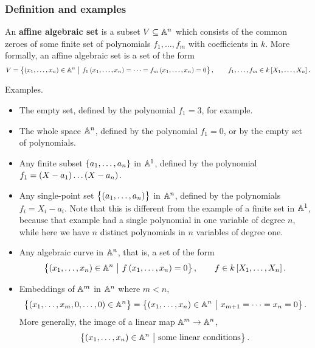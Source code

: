 \subsubsection{Definition and examples}


\begin{definition*}
An \textbf{affine algebraic set} is a subset $ V \subseteq \AA^n $ which consists of the common zeroes of some finite set of polynomials $ f_1, \dots, f_m $ with coefficients in $ k $. More formally, an affine algebraic set is a set of the form
$$ V = \cbr{\br{x_1, \dots, x_n} \in \AA^n \st f_1\br{x_1, \dots, x_n} = \dots = f_m\br{x_1, \dots, x_n} = 0}, \qquad f_1, \dots, f_m \in k\sbr{X_1, \dots, X_n}. $$
\end{definition*}

\begin{example*}
Examples.
\begin{itemize}
\item The empty set, defined by the polynomial $ f_1 = 3 $, for example.
\item The whole space $ \AA^n $, defined by the polynomial $ f_1 = 0 $, or by the empty set of polynomials.
\item Any finite subset $ \cbr{a_1, \dots, a_n} $ in $ \AA^1 $, defined by the polynomial $ f_1 = \br{X - a_1} \dots \br{X - a_n} $.
\item Any single-point set $ \cbr{\br{a_1, \dots, a_n}} $ in $ \AA^n $, defined by the polynomials $ f_i = X_i - a_i $. Note that this is different from the example of a finite set in $ \AA^1 $, because that example had a single polynomial in one variable of degree $ n $, while here we have $ n $ distinct polynomials in $ n $ variables of degree one.
\item Any algebraic curve in $ \AA^n $, that is, a set of the form
$$ \cbr{\br{x_1, \dots, x_n} \in \AA^n \st f\br{x_1, \dots, x_n} = 0}, \qquad f \in k\sbr{X_1, \dots, X_n}. $$
\item Embeddings of $ \AA^m $ in $ \AA^n $ where $ m < n $,
$$ \cbr{\br{x_1, \dots, x_m, 0, \dots, 0} \in \AA^n} = \cbr{\br{x_1, \dots, x_n} \in \AA^n \st x_{m + 1} = \dots = x_n = 0}. $$
More generally, the image of a linear map $ \AA^m \to \AA^n $,
$$ \cbr{\br{x_1, \dots, x_n} \in \AA^n \st \text{some linear conditions}}. $$
\end{itemize}
\end{example*}

\pagebreak

